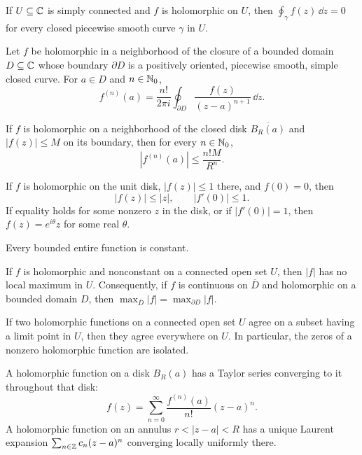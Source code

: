 \begin{theorem}
If $U\subseteq\mathbb{C}$ is simply connected and $f$ is holomorphic on $U$, then $\oint_\gamma f(z)\,\dd z=0$ for every closed piecewise smooth curve $\gamma$ in $U$.
\end{theorem}

\begin{theorem}
Let $f$ be holomorphic in a neighborhood of the closure of a bounded domain $D\subseteq\mathbb{C}$ whose boundary $\partial D$ is a positively oriented, piecewise smooth, simple closed curve. For $a\in D$ and $n\in\mathbb{N}_0$,
\[
 f^{(n)}(a)=\frac{n!}{2\pi i}\oint_{\partial D}\frac{f(z)}{(z-a)^{n+1}}\,\dd z.
\]
\end{theorem}

\begin{theorem}
If $f$ is holomorphic on a neighborhood of the closed disk $\overline{B_R(a)}$ and $|f(z)|\le M$ on its boundary, then for every $n\in\mathbb{N}_0$,
\[
 |f^{(n)}(a)|\le\frac{n!M}{R^n}.
\]
\end{theorem}

\begin{theorem}
If $f$ is holomorphic on the unit disk, $|f(z)|\le1$ there, and $f(0)=0$, then
\[
 |f(z)|\le|z|,\qquad |f'(0)|\le1.
\]
If equality holds for some nonzero $z$ in the disk, or if $|f'(0)|=1$, then $f(z)=e^{i\theta}z$ for some real $\theta$.
\end{theorem}

\begin{theorem}
Every bounded entire function is constant.
\end{theorem}

\begin{theorem}
If $f$ is holomorphic and nonconstant on a connected open set $U$, then $|f|$ has no local maximum in $U$. Consequently, if $f$ is continuous on $\overline D$ and holomorphic on a bounded domain $D$, then $\max_{\overline D}|f|=\max_{\partial D}|f|$.
\end{theorem}

\begin{theorem}
If two holomorphic functions on a connected open set $U$ agree on a subset having a limit point in $U$, then they agree everywhere on $U$. In particular, the zeros of a nonzero holomorphic function are isolated.
\end{theorem}

\begin{theorem}
A holomorphic function on a disk $B_R(a)$ has a Taylor series converging to it throughout that disk:
\[
 f(z)=\sum_{n=0}^\infty\frac{f^{(n)}(a)}{n!}(z-a)^n.
\]
A holomorphic function on an annulus $r<|z-a|<R$ has a unique Laurent expansion $\sum_{n\in\mathbb{Z}}c_n(z-a)^n$ converging locally uniformly there.
\end{theorem}

